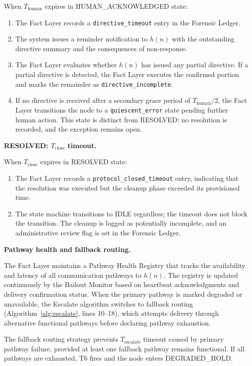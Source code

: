 When $T_{\text{human}}$ expires in HUMAN\_ACKNOWLEDGED state:
\begin{enumerate}\itemsep=0pt
\item The Fact Layer records a \texttt{directive\_timeout} entry in the Forensic Ledger.
\item The system issues a reminder notification to $h(n)$ with the outstanding directive summary and the consequences of non-response.
\item The Fact Layer evaluates whether $h(n)$ has issued any partial directive. If a partial directive is detected, the Fact Layer executes the confirmed portion and marks the remainder as \texttt{directive\_incomplete}.
\item If no directive is received after a secondary grace period of $T_{\text{human}} / 2$, the Fact Layer transitions the node to a \texttt{quiescent\_error} state pending further human action. This state is distinct from RESOLVED: no resolution is recorded, and the exception remains open.
\end{enumerate}

\bigskip
\noindent\textbf{RESOLVED: $T_{\text{close}}$ timeout.}

When $T_{\text{close}}$ expires in RESOLVED state:
\begin{enumerate}\itemsep=0pt
\item The Fact Layer records a \texttt{protocol\_closed\_timeout} entry, indicating that the resolution was executed but the cleanup phase exceeded its provisioned time.
\item The state machine transitions to IDLE regardless; the timeout does not block the transition. The cleanup is logged as potentially incomplete, and an administrative review flag is set in the Forensic Ledger.
\end{enumerate}

\bigskip
\noindent\textbf{Pathway health and fallback routing.}

The Fact Layer maintains a Pathway Health Registry that tracks the availability and latency of all communication pathways to $h(n)$. The registry is updated continuously by the Bailout Monitor based on heartbeat acknowledgments and delivery confirmation status. When the primary pathway is marked degraded or unavailable, the Escalate algorithm switches to fallback routing (Algorithm~\ref{alg:escalate}, lines 10--18), which attempts delivery through alternative functional pathways before declaring pathway exhaustion.

The fallback routing strategy prevents $T_{\text{escalate}}$ timeout caused by primary pathway failure, provided at least one fallback pathway remains functional. If all pathways are exhausted, T6 fires and the node enters DEGRADED\_HOLD.

